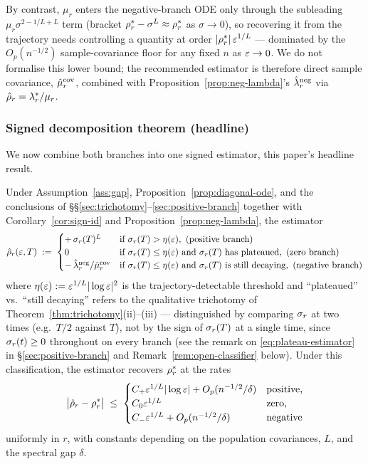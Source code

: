 By contrast, $\mu_r$ enters the negative-branch ODE only through the subleading
$\mu_r\sigma^{2-1/L+L}$ term (bracket $\rho_r^*-\sigma^L\approx\rho_r^*$ as
$\sigma\to0$), so recovering it from the trajectory needs controlling a quantity
at order $|\rho_r^*|\,\varepsilon^{1/L}$ — dominated by the $O_p(n^{-1/2})$
sample-covariance floor for any fixed $n$ as $\varepsilon\to0$. We do not formalise this
lower bound; the recommended estimator is therefore direct sample covariance,
$\hat{\mu}_r^{\mathrm{cov}}$, combined with Proposition~\ref{prop:neg-lambda}'s
$\hat{\lambda}_r^{\mathrm{neg}}$ via $\hat{\rho}_r = \lambda_r^*/\mu_r$.

\subsubsection{Signed decomposition theorem (headline)}
\label{ssec:headline-formal}

We now combine both branches into one signed estimator, this paper's headline result.

\begin{theorem}
\label{thm:headline-formal}
Under Assumption~\ref{ass:gap}, Proposition~\ref{prop:diagonal-ode},
and the conclusions of \S\S\ref{sec:trichotomy}--\ref{sec:positive-branch}
together with Corollary~\ref{cor:sign-id} and Proposition~\ref{prop:neg-lambda},
the estimator
\begin{equation}
\label{eq:headline-estimator}
\hat{\rho}_r(\varepsilon, T)
\;:=\;
\begin{cases}
+\,\sigma_r(T)^{L} & \text{if } \sigma_r(T) > \eta(\varepsilon),
  \text{ (positive branch)} \\
0 & \text{if } \sigma_r(T) \le \eta(\varepsilon) \text{ and } \sigma_r(T)
  \text{ has plateaued}, \text{ (zero branch)} \\
-\,\hat{\lambda}_r^{\mathrm{neg}}/\hat{\mu}_r^{\mathrm{cov}}
  & \text{if } \sigma_r(T) \le \eta(\varepsilon) \text{ and } \sigma_r(T)
  \text{ is still decaying}, \text{ (negative branch)}
\end{cases}
\end{equation}
where $\eta(\varepsilon) := \varepsilon^{1/L}|\log\varepsilon|^2$ is the
trajectory-detectable threshold and ``plateaued'' vs.\ ``still
decaying'' refers to the qualitative trichotomy of
Theorem~\ref{thm:trichotomy}(ii)--(iii) --- distinguished by comparing
$\sigma_r$ at two times (e.g.\ $T/2$ against $T$), not by the sign of
$\sigma_r(T)$ at a single time, since $\sigma_r(t) \ge 0$ throughout on
every branch (see the remark on
\eqref{eq:plateau-estimator} in \S\ref{sec:positive-branch} and
Remark~\ref{rem:open-classifier} below).
Under this classification, the estimator recovers $\rho_r^*$ at the
rates
\[
\big|\hat{\rho}_r - \rho_r^*\big| \;\le\;
\begin{cases}
C_+ \varepsilon^{1/L}|\log\varepsilon| + O_p(n^{-1/2}/\delta) & \text{positive,} \\
C_0 \varepsilon^{1/L} & \text{zero,} \\
C_- \varepsilon^{1/L} + O_p(n^{-1/2}/\delta) & \text{negative}
\end{cases}
\]
uniformly in $r$, with constants depending on the population covariances,
$L$, and the spectral gap $\delta$.
\end{theorem}

